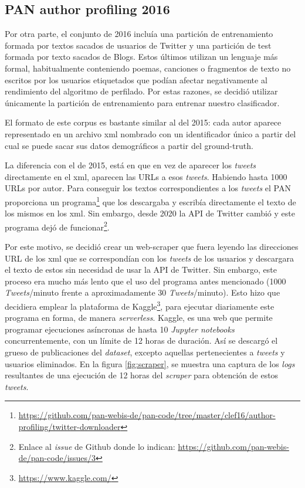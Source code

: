   \subsection{PAN author profiling 2016}
  \label{subsec:dataset2016}
  
 Por otra parte, el conjunto de 2016 incluía una partición de entrenamiento formada por textos sacados de usuarios de Twitter y una partición de test formada por texto sacados de Blogs. Estos últimos utilizan un lenguaje más formal, habitualmente conteniendo poemas, canciones o fragmentos de texto no escritos por los usuarios etiquetados que podían afectar negativamente al rendimiento del algoritmo de perfilado. Por estas razones, se decidió utilizar únicamente la partición de entrenamiento para entrenar nuestro clasificador.
 
 El formato de este corpus es bastante similar al del 2015: cada autor aparece representado en un archivo \acrshort{xml} nombrado con un identificador único a partir del cual se puede sacar sus datos demográficos a partir del \gls{ground-truth}.
 
 La diferencia con el de 2015, está en que en vez de aparecer los \textit{tweets} directamente en el \acrshort{xml}, aparecen las URLs a esos \textit{tweets}. Habiendo hasta 1000 URLs por autor. Para conseguir los textos correspondientes a los \textit{tweets} el PAN proporciona un programa\footnote{\url{https://github.com/pan-webis-de/pan-code/tree/master/clef16/author-profiling/twitter-downloader}} que los descargaba y escribía directamente el texto de los mismos en los \acrshort{xml}. Sin embargo, desde 2020 la API de Twitter cambió y este programa dejó de funcionar\footnote{Enlace al \textit{issue} de Github donde lo indican: \url{https://github.com/pan-webis-de/pan-code/issues/3}}.
 
 Por este motivo, se decidió crear un \gls{web-scraper} que fuera leyendo las direcciones URL de los \acrshort{xml} que se correspondían con los \textit{tweets} de los usuarios y descargara el texto de estos sin necesidad de usar la API de Twitter. Sin embargo, este proceso era mucho más lento que el uso del programa antes mencionado (1000 \textit{Tweets}/minuto frente a aproximadamente 30 \textit{Tweets}/minuto). Esto hizo que decidiera emplear la plataforma de Kaggle\footnote{\url{https://www.kaggle.com/}}, para ejecutar diariamente este programa en forma, de manera \textit{serverless}. Kaggle, es una web que permite programar ejecuciones asíncronas de hasta 10 \textit{Jupyter notebooks} concurrentemente, con un límite de 12 horas de duración. Así se descargó el grueso de publicaciones del \textit{dataset}, excepto aquellas pertenecientes a \textit{tweets} y usuarios eliminados. En la figura \ref{fig:scraper}, se muestra una captura de los \textit{logs} resultantes de una ejecución de 12 horas del \textit{scraper} para obtención de estos \textit{tweets}.

